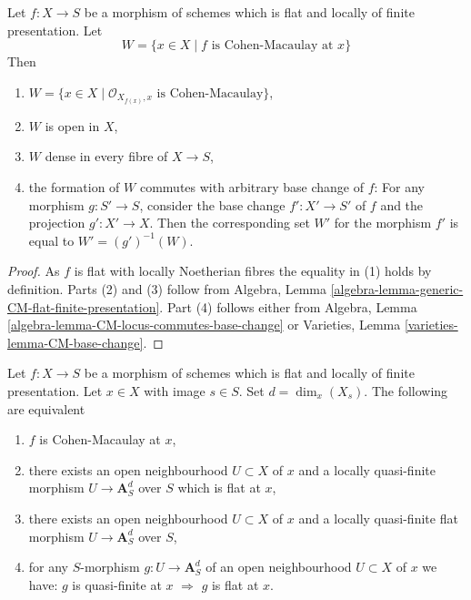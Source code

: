 \begin{lemma}
\label{lemma-flat-finite-presentation-CM-open}
\begin{reference}
\cite[IV Corollary 12.1.7(iii)]{EGA}
\end{reference}
Let $f : X \to S$ be a morphism of schemes which is flat and locally
of finite presentation. Let
$$
W = \{x \in X \mid f\text{ is Cohen-Macaulay at }x\}
$$
Then
\begin{enumerate}
\item $W = \{x \in X \mid \mathcal{O}_{X_{f(x)}, x}\text{ is Cohen-Macaulay}\}$,
\item $W$ is open in $X$,
\item $W$ dense in every fibre of $X \to S$,
\item the formation of $W$ commutes with arbitrary base change of $f$:
For any morphism $g : S' \to S$, consider
the base change $f' : X' \to S'$ of $f$ and the
projection $g' : X' \to X$. Then the corresponding
set $W'$ for the morphism $f'$ is equal to $W' = (g')^{-1}(W)$.
\end{enumerate}
\end{lemma}

\begin{proof}
As $f$ is flat with locally Noetherian fibres the equality in (1) holds
by definition. Parts (2) and (3) follow from
Algebra, Lemma \ref{algebra-lemma-generic-CM-flat-finite-presentation}.
Part (4) follows either from
Algebra, Lemma \ref{algebra-lemma-CM-locus-commutes-base-change}
or
Varieties, Lemma \ref{varieties-lemma-CM-base-change}.
\end{proof}

\begin{lemma}
\label{lemma-flat-finite-presentation-characterize-CM}
Let $f : X \to S$ be a morphism of schemes which is flat and locally
of finite presentation. Let $x \in X$ with image $s \in S$.
Set $d = \dim_x(X_s)$.
The following are equivalent
\begin{enumerate}
\item $f$ is Cohen-Macaulay at $x$,
\item there exists an open neighbourhood $U \subset X$ of $x$
and a locally quasi-finite morphism $U \to \mathbf{A}^d_S$ over $S$
which is flat at $x$,
\item there exists an open neighbourhood $U \subset X$ of $x$
and a locally quasi-finite flat morphism $U \to \mathbf{A}^d_S$ over $S$,
\item for any $S$-morphism $g : U \to \mathbf{A}^d_S$
of an open neighbourhood $U \subset X$ of $x$ we have:
$g$ is quasi-finite at $x$ $\Rightarrow$ $g$ is flat at $x$.
\end{enumerate}
\end{lemma}

